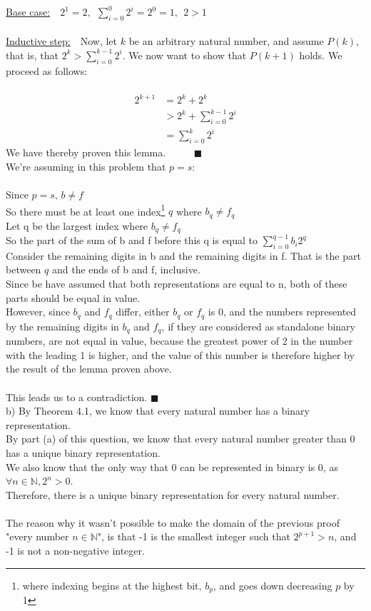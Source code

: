\documentclass{article}
\newcommand{\N}{\mathbb{N}}
\begin{document}
\begin{enumerate}
	\underline{Base case:}\ \ $2^1=2,\ \ \sum_{i=0}^{0}2^i=2^0=1,\ \ 2>1$ \\\\
	\underline{Inductive step:}\ \ Now, let $k$ be an arbitrary natural number, and assume $P(k)$, that is, that $2^k>\sum_{i=0}^{k-1}2^i$. We now want to show that $P(k+1)$ holds. We proceed as follows: \\\\
	\begin{align*}
		2^{k+1} &= 2^k + 2^k \\
		&> 2^k + \sum_{i=0}^{k-1}2^i \\
		&= \sum_{i=0}^{k}2^i
	\end{align*}
	We have thereby proven this lemma. \ \ \ \ \ $\blacksquare$\\ 
	
	We're assuming in this problem that $p = s$:\\\\
	Since $p=s$, $b \neq f$\\
	So there must be at least one index\footnote{where indexing begins at the highest bit, $b_p$, and goes down decreasing $p$ by 1} $q$ where $b_q \neq f_q$\\
	Let q be the largest index where $b_q \neq f_q$\\
	So the part of the sum of b and f before this q is equal to ${\displaystyle \sum_{i = 0}^{q-1} b_i2^q}$\\ 
	Consider the remaining digits in b and the remaining digits in f. That is the part between $q$ and the ends of b and f, inclusive.\\
	Since be have assumed that both representations are equal to n, both of these parts should be equal in value.\\

	
	However, since $b_q$ and $f_q$ differ, either $b_q$ or $f_q$ is 0, and the numbers represented by the remaining digits in $b_q$ and $f_q$, if they are considered as standalone binary numbers, are not equal in value, because the greatest power of 2 in the number with the leading 1 is higher, and the value of this number is therefore higher by the result of the lemma proven above. \\\\
	
	This leads us to a contradiction. \null\hfill $\blacksquare$\\
	
	b) By Theorem 4.1, we know that every natural number has a binary representation.\\
	By part (a) of this question, we know that every natural number greater than 0 has a unique binary representation.\\
	We also know that the only way that 0 can be represented in binary is 0, as $\forall n \in \N, 2^n>0$.\\
	Therefore, there is a unique binary representation for every natural number. \\\\
	The reason why it wasn't possible to make the domain of the previous proof "every number $n\in \N$", 
	is that -1 is the smallest integer such that $2^{p+1} > n$, and -1 is not a non-negative integer.


\end{enumerate}
\end{document}
